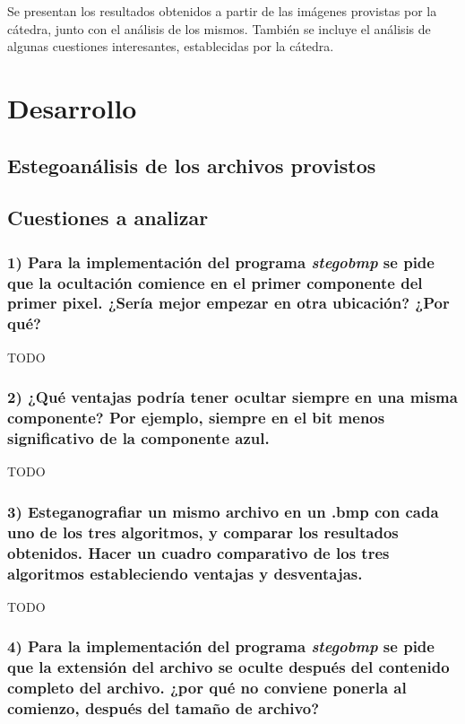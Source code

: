 \documentclass[a4paper,10pt]{article}
\begin{document}
Se presentan los resultados obtenidos a partir de las imágenes provistas por la cátedra, junto con el análisis de los mismos.
También se incluye el análisis de algunas cuestiones interesantes, establecidas por la cátedra.

\section{Desarrollo}

\subsection{Estegoanálisis de los archivos provistos}

\subsection{Cuestiones a analizar}

\subsubsection*{ 1) Para la implementación del programa \textit{stegobmp} se pide que la ocultación comience en el
primer componente del primer pixel. ¿Sería mejor empezar en otra ubicación? ¿Por qué?}

TODO

\subsubsection*{ 2) ¿Qué ventajas podría tener ocultar siempre en una misma componente? Por ejemplo, siempre
en el bit menos significativo de la componente azul.}

TODO

\subsubsection*{ 3) Esteganografiar un mismo archivo en un .bmp con cada uno de los tres algoritmos, y comparar
los resultados obtenidos. Hacer un cuadro comparativo de los tres algoritmos estableciendo ventajas y desventajas.}

TODO

\subsubsection*{ 4) Para la implementación del programa \textit{stegobmp} se pide que la extensión del archivo se oculte
después del contenido completo del archivo. ¿por qué no conviene ponerla al comienzo, después del tamaño de archivo?}
\end{document}
